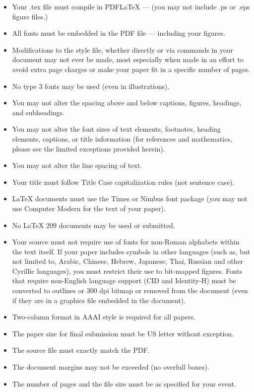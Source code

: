 \begin{itemize}
\item Your .tex file must compile in PDF\LaTeX{} --- (you may not include .ps or .eps figure files.)
\item All fonts must be embedded in the PDF file --- including your figures.
\item Modifications to the style file, whether directly or via commands in your document may not ever be made, most especially when made in an effort to avoid extra page charges or make your paper fit in a specific number of pages.
\item No type 3 fonts may be used (even in illustrations).
\item You may not alter the spacing above and below captions, figures, headings, and subheadings.
\item You may not alter the font sizes of text elements, footnotes, heading elements, captions, or title information (for references and mathematics, please see the limited exceptions provided herein).
\item You may not alter the line spacing of text.
\item Your title must follow Title Case capitalization rules (not sentence case).
\item \LaTeX{} documents must use the Times or Nimbus font package (you may not use Computer Modern for the text of your paper).
\item No \LaTeX{} 209 documents may be used or submitted.
\item Your source must not require use of fonts for non-Roman alphabets within the text itself. If your paper includes symbols in other languages (such as, but not limited to, Arabic, Chinese, Hebrew, Japanese, Thai, Russian and other Cyrillic languages), you must restrict their use to bit-mapped figures. Fonts that require non-English language support (CID and Identity-H) must be converted to outlines or 300 dpi bitmap or removed from the document (even if they are in a graphics file embedded in the document).
\item Two-column format in AAAI style is required for all papers.
\item The paper size for final submission must be US letter without exception.
\item The source file must exactly match the PDF.
\item The document margins may not be exceeded (no overfull boxes).
\item The number of pages and the file size must be as specified for your event.

\end{itemize}
